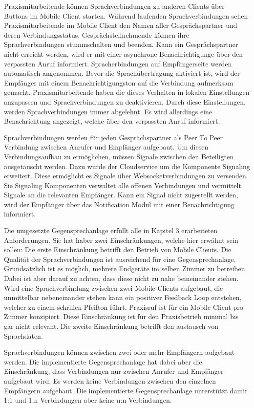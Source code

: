 Praxismitarbeitende können Sprachverbindungen zu anderen Clients über Buttons im Mobile Client starten.
Während laufenden Sprachverbindungen sehen Praxismitarbeitende im Mobile Client den Namen aller Gesprächspartner und deren Verbindungsstatus.
Gesprächsteilnehmende können ihre Sprachverbindungen stummschalten und beenden.
Kann ein Gesprächspartner nicht erreicht werden, wird er mit einer asynchrone Benachrichtigunge über den verpassten Anruf informiert.
Spracherbindungen auf Empfängerseite werden automatisch angenommen.
Bevor die Sprachübertragung aktiviert ist, wird der Empfänger mit einem Benachrichtigungston auf die Verbindung aufmerksam gemacht.
Praxismitarbeitende haben die dieses Verhalten in lokalen Einstellungen anzupassen und Sprachverbindungen zu deaktivieren.
Durch diese Einstellungen, werden Sprachverbindungen immer abgelehnt.
Es wird allerdings eine Benachrichtung angezeigt, welche über den verpassten Anruf informiert.

Sprachverbindungen werden für jeden Gesprächspartner als Peer To Peer Verbindung zwischen Anrufer und Empfänger aufgebaut.
Um diesen Verbindungsaufbau zu ermöglichen, müssen Signale zwischen den Beteiligten ausgetauscht werden.
Dazu wurde der Cloudservice um die Komponente Signaling erweitert.
Diese ermöglicht es Signale über Websocketverbindungen zu versenden.
Sie Signaling Komponenten verwaltet alle offenen Verbindungen und vermittelt Signale an die relevanten Empfänger.
Kann ein Signal nicht zugestellt werden, wird der Empfänger über das Notification Modul mit einer Benachrichtigung informiert.

Die umgesetzte Gegensprechanlage erfüllt alle in Kapitel 3 erarbeiteten Anforderungen.
Sie hat haber zwei Einschränkungen, welche hier erwähnt sein sollen:
Die erste Einschränkung betrifft den Betrieb von Mobile Clients.
Die Qualität der Sprachverbindungen ist ausreichend für eine Gegensprechanlage.
Grundsätzlich ist es möglich, mehrere Endgeräte im selben Zimmer zu betreiben.
Dabei ist aber darauf zu achten, dass diese nicht zu nahe beineinander stehen.
Wird eine Sprachverbindung zwischen zwei Mobile Clients aufgebaut, die unmittelbar nebeneinander stehen kann ein positiver Feedback Loop entstehen, welcher zu einem schrillen Pfeifton führt.
Praxisruf ist für ein Mobile Client pro Zimmer konzipiert.
Diese Einschränkung ist für den Praxisbetrieb minimal bis gar nicht relevant.
Die zweite Einschränkung betrifft den austausch von Sprachdaten.

Sprachverbindungen können zwischen zwei oder mehr Empfängern aufgebaut werden.
Die implementierte Gegensprechanlage hat dabei aber die Einschränkung, dass Verbindungen nur zwischen Anrufer und Empfänger aufgebaut wird.
Es werden keine Verbindungen zwischen den einzelnen Empfängern aufgebaut.
Die implementierte Gegensprechanlage unterstützt damit 1:1 und 1:n Verbindungen aber keine n:n Verbindungen.


